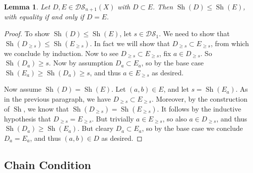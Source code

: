\documentclass{amsart}
\newtheorem{lemma}[theorem]{Lemma}
\theoremstyle{definition}
\begin{document}
\begin{lemma}
    Let $D,E\in\mathcal{DS}_{n+1}(X)$ with $D\subset E$. Then $\operatorname{Sh}(D)\leq\operatorname{Sh}(E)$, with equality if and only if $D=E$.
\end{lemma}
\begin{proof}
    To show $\operatorname{Sh}(D)\leq\operatorname{Sh}(E)$, let $s\in\mathcal{DS}_1$. We need to show that $\operatorname{Sh}(D_{\geq s})\leq\operatorname{Sh}(E_{\geq s})$. In fact we will show that $D_{\geq s}\subset E_{\geq s}$, from which we conclude by induction. Now to see $D_{\geq s}\subset E_{\geq s}$, fix $a\in D_{\geq s}$. So $\operatorname{Sh}(D_a)\geq s$. Now by assumption $D_a\subset E_a$, so by the base case $\operatorname{Sh}(E_a)\geq\operatorname{Sh}(D_a)\geq s$, and thus $a\in E_{\geq s}$ as desired.

    Now assume $\operatorname{Sh}(D)=\operatorname{Sh}(E)$. Let $(a,b)\in E$, and let $s=\operatorname{Sh}(E_a)$. As in the previous paragraph, we have $D_{\geq s}\subset E_{\geq s}$. Moreover, by the construction of $\operatorname{Sh}$, we know that $\operatorname{Sh}(D_{\geq s})=\operatorname{Sh}(E_{\geq s})$. It follows by the inductive hypothesis that $D_{\geq s}=E_{\geq s}$. But trivially $a\in E_{\geq s}$, so also $a\in D_{\geq s}$, and thus $\operatorname{Sh}(D_a)\geq\operatorname{Sh}(E_a)$. But cleary $D_a\subset E_a$, so by the base case we conclude $D_a=E_a$, and thus $(a,b)\in D$ as desired.
\end{proof}

\subsection{Chain Condition}
\end{document}
